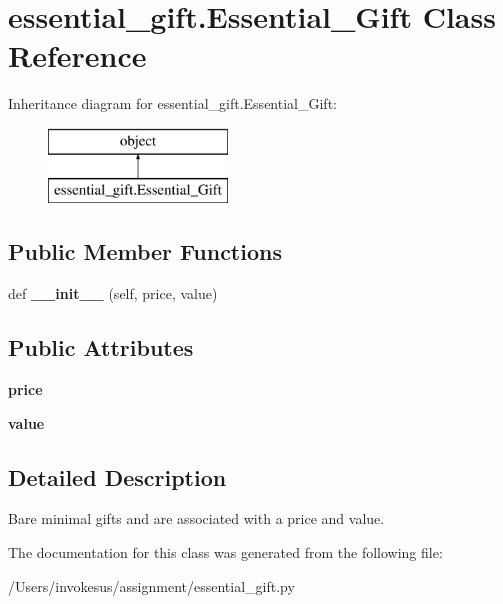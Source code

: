 \hypertarget{classessential__gift_1_1_essential___gift}{}\section{essential\+\_\+gift.\+Essential\+\_\+\+Gift Class Reference}
\label{classessential__gift_1_1_essential___gift}
Inheritance diagram for essential\+\_\+gift.\+Essential\+\_\+\+Gift\+:\begin{figure}[H]
\begin{center}
\leavevmode
\includegraphics[height=2.000000cm]{classessential__gift_1_1_essential___gift}
\end{center}
\end{figure}
\subsection*{Public Member Functions}
\begin{DoxyCompactItemize}
\item 
\mbox{\label{classessential__gift_1_1_essential___gift_a3425b38913d6abbb0d2976ea3339aadd}} 
def {\bfseries \+\_\+\+\_\+init\+\_\+\+\_\+} (self, price, value)
\end{DoxyCompactItemize}
\subsection*{Public Attributes}
\begin{DoxyCompactItemize}
\item 
\mbox{\label{classessential__gift_1_1_essential___gift_aa0895da6a47b0591270e45f564f31fe4}} 
{\bfseries price}
\item 
\mbox{\label{classessential__gift_1_1_essential___gift_a0efdc8693deea51040a398e296bfece7}} 
{\bfseries value}
\end{DoxyCompactItemize}


\subsection{Detailed Description}
\begin{DoxyVerb}Bare minimal gifts and are associated with a price and value.
\end{DoxyVerb}
 

The documentation for this class was generated from the following file\+:\begin{DoxyCompactItemize}
\item 
/\+Users/invokesus/assignment/essential\+\_\+gift.\+py\end{DoxyCompactItemize}
